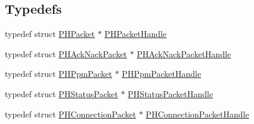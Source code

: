 \subsection*{\-Typedefs}
\begin{DoxyCompactItemize}
\item 
typedef struct \hyperlink{struct_p_h_packet}{\-P\-H\-Packet} $\ast$ \hyperlink{group___tau_labs_libraries_gaa252eac3dc3346fec375be8805fd8694}{\-P\-H\-Packet\-Handle}
\item 
typedef struct \hyperlink{struct_p_h_ack_nack_packet}{\-P\-H\-Ack\-Nack\-Packet} $\ast$ \hyperlink{group___tau_labs_libraries_gafd4ce42b4793fdd6ccdba127272056b4}{\-P\-H\-Ack\-Nack\-Packet\-Handle}
\item 
typedef struct \hyperlink{struct_p_h_ppm_packet}{\-P\-H\-Ppm\-Packet} $\ast$ \hyperlink{group___tau_labs_libraries_ga64fda6fd21f38899abc02e01a8920fe2}{\-P\-H\-Ppm\-Packet\-Handle}
\item 
typedef struct \hyperlink{struct_p_h_status_packet}{\-P\-H\-Status\-Packet} $\ast$ \hyperlink{group___tau_labs_libraries_gaba4b593b2564f247de7ae01fe86e908a}{\-P\-H\-Status\-Packet\-Handle}
\item 
typedef struct \hyperlink{struct_p_h_connection_packet}{\-P\-H\-Connection\-Packet} $\ast$ \hyperlink{group___tau_labs_libraries_ga2c36c280fa284ae25b54eba06a601805}{\-P\-H\-Connection\-Packet\-Handle}
\end{DoxyCompactItemize}
